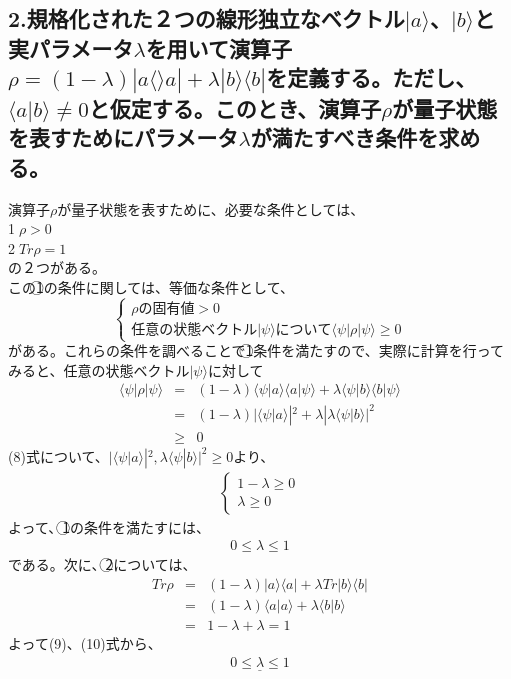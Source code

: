 \documentclass[10pt]{jreport}
\begin{document}
\subsection*{2.規格化された２つの線形独立なベクトル$|a\rangle$、$|b\rangle$と実パラメータ$\lambda$を用いて演算子$\rho=(1-\lambda)|a\langle \rangle a|+\lambda|b\rangle\langle b|$を定義する。ただし、$\langle a | b\rangle \neq 0$と仮定する。このとき、演算子$\rho$が量子状態を表すためにパラメータ$\lambda$が満たすべき条件を求める。}

演算子$\rho$が量子状態を表すために、必要な条件としては、\\
\textcircled{\scriptsize 1}$\rho > 0$ \\
\textcircled{\scriptsize 2}$Tr\rho =1 $\\
の２つがある。\\
この\textcircled{\scriptsize 1}の条件に関しては、等価な条件として、\\
\[
\left\{
\begin{array}{ll}
  \rho の固有値　>0\\
任意の状態ベクトル|\psi \rangle について \langle \psi | \rho |\psi \rangle \geq 0
\end{array}
\right.
\]
がある。これらの条件を調べることで\textcircled{\scriptsize 1}条件を満たすので、実際に計算を行ってみると、任意の状態ベクトル$|\psi \rangle$に対して
\begin{eqnarray}
\langle \psi | \rho |\psi \rangle &=& (1-\lambda) \langle \psi |a \rangle \langle a  |\psi \rangle + \lambda \langle \psi |b \rangle \langle b   |\psi \rangle \nonumber \\
&=& (1-\lambda)|\langle \psi |a \rangle  |^2 + \lambda| \lambda \langle \psi |b \rangle|^2 \nonumber \\
&\geq& 0 
\end{eqnarray}
(8)式について、$|\langle \psi |a \rangle  |^2, \lambda \langle \psi |b \rangle|^2  \geq 0$より、
\begin{eqnarray}
\left\{
\begin{array}{ll}
  1-\lambda　\geq0 \nonumber \\
  \lambda \geq 0 \nonumber 
\end{array}
\right.
\end{eqnarray}
よって、\textcircled{\scriptsize 1}の条件を満たすには、
\begin{eqnarray}
0 \leq \lambda \leq 1
\end{eqnarray}
である。次に、\textcircled{\scriptsize 2}については、
\begin{eqnarray}
Tr \rho &=& (1-\lambda) |a \rangle \langle a | + \lambda Tr|b \rangle \langle b | \nonumber  \\
&=& (1-\lambda)\langle a |a \rangle + \lambda \langle b | b \rangle  \nonumber \\
&=& 1- \lambda + \lambda =1
\end{eqnarray}
よって(9)、(10)式から、
\begin{eqnarray}
\underline{0 \leq \lambda \leq 1} 
\end{eqnarray}
\end{document}
